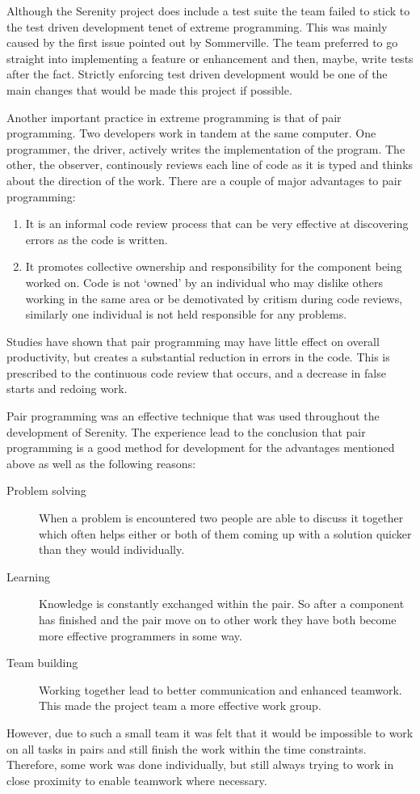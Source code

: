 Although the Serenity project does include a test suite the team failed to stick to the test
driven development tenet of extreme programming. This was mainly caused by the first issue
pointed out by Sommerville. The team preferred to go straight into implementing a feature or
enhancement and then, maybe, write tests after the fact. Strictly enforcing test driven development
would be one of the main changes that would be made this project if possible.

Another important practice in extreme programming is that of pair programming. Two developers
work in tandem at the same computer. One programmer, the driver, actively writes the implementation
of the program. The other, the observer, continously reviews each line of code as it is typed 
and thinks about the direction of the work.\cite{williams2001} There are a couple of major advantages
to pair programming:

\begin{enumerate}
\item It is an informal code review process that can be very effective at discovering errors
      as the code is written.

\item It promotes collective ownership and responsibility for the component being worked on.
      Code is not `owned' by an individual who may dislike others working in the same area or
      be demotivated by critism during code reviews, similarly one individual is not held responsible
      for any problems.
\end{enumerate}

Studies have shown that pair programming may have little effect on overall productivity, but
creates a substantial reduction in errors in the code.\cite{cockburn2000} This is prescribed
to the continuous code review that occurs, and a decrease in false starts and redoing work.

Pair programming was an effective technique that was used throughout the development of
Serenity. The experience lead to the conclusion that pair programming is a good method for
development for the advantages mentioned above as well as the following reasons:

\begin{description}
\item[Problem solving] When a problem is encountered two people are able to discuss it together
which often helps either or both of them coming up with a solution quicker than they would
individually.

\item[Learning] Knowledge is constantly exchanged within the pair. So after a component
has finished and the pair move on to other work they have both become more effective programmers
in some way.

\item[Team building] Working together lead to better communication and enhanced teamwork.
This made the project team a more effective work group.
\end{description}

However, due to such a small team it was felt that it would be impossible to work on all
tasks in pairs and still finish the work within the time constraints. Therefore, some work
was done individually, but still always trying to work in close proximity to enable teamwork
where necessary.
